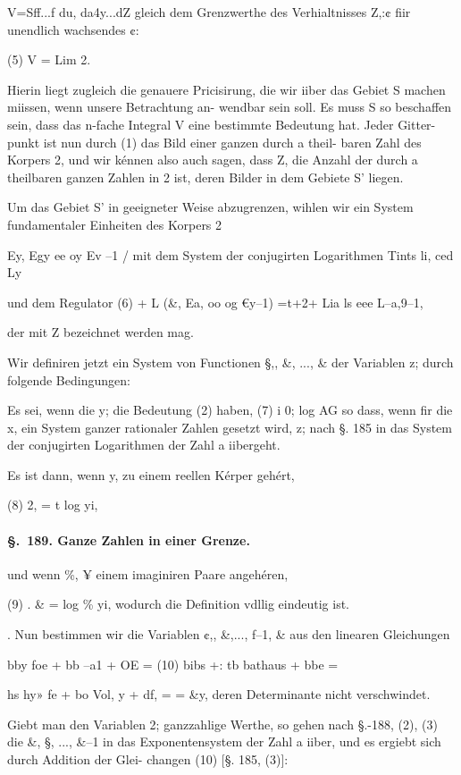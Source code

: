 \documentclass[12pt,a4paper]{article}
\theoremstyle{plain}
\theoremstyle{definition}
\begin{document}
V=Sff...f du, da4y...dZ gleich dem Grenzwerthe des Verhialtnisses Z,:¢ fiir unendlich wachsendes ¢:

(5) V = Lim 2.

Hierin liegt zugleich die genauere Pricisirung, die wir iiber das Gebiet S machen miissen, wenn unsere Betrachtung an- wendbar sein soll. Es muss S so beschaffen sein, dass das n-fache Integral V eine bestimmte Bedeutung hat. Jeder Gitter- punkt ist nun durch (1) das Bild einer ganzen durch a theil- baren Zahl des Korpers 2, und wir kénnen also auch sagen, dass Z, die Anzahl der durch a theilbaren ganzen Zahlen in 2 ist, deren Bilder in dem Gebiete S' liegen.

Um das Gebiet S' in geeigneter Weise abzugrenzen, wihlen wir ein System fundamentaler Einheiten des Korpers 2

Ey, Egy ee oy Ev --1 / mit dem System der conjugirten Logarithmen Tints li, ced Ly

und dem Regulator (6) + L (\&, Ea, oo og €y--1) =t+2+ Lia ls eee L--a,9--1,

der mit Z bezeichnet werden mag.

Wir definiren jetzt ein System von Functionen §,, \&, ..., \& der Variablen z; durch folgende Bedingungen:

Es sei, wenn die y; die Bedeutung (2) haben, (7) i 0; log AG so dass, wenn fir die x, ein System ganzer rationaler Zahlen gesetzt wird, z; nach §. 185 in das System der conjugirten Logarithmen der Zahl a iibergeht.

Es ist dann, wenn y, zu einem reellen Kérper gehért,

(8) 2, = t log yi,

\paragraph{\S.~189. Ganze Zahlen in einer Grenze.}


und wenn \%, ¥ einem imaginiren Paare angehéren,

(9) . \& = log \% yi, wodurch die Definition vdllig eindeutig ist.

. Nun bestimmen wir die Variablen ¢,, \&,..., f--1, \& aus den linearen Gleichungen

bby foe + bb --a1 + OE = (10) bibs +: tb bathaus + bbe =

hs hy» fe + bo Vol, y + df, = = \&y, deren Determinante nicht verschwindet.

Giebt man den Variablen 2; ganzzahlige Werthe, so gehen nach §.-188, (2), (3) die \&, §, ..., \&--1 in das Exponentensystem der Zahl a iiber, und es ergiebt sich durch Addition der Glei- changen (10) [§. 185, (3)]:
\end{document}
